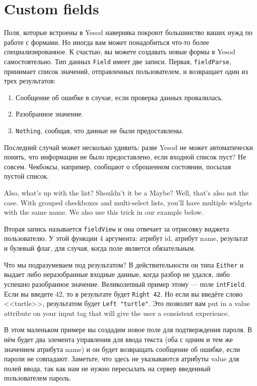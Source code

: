 \section{Custom fields}
Поля, которые встроены в Yesod наверняка покроют большинство ваших нужд по 
работе с формами. Но иногда вам может понадобиться что-то более специализированное.
К счастью, вы можете создавать новые формы в Yesod самостоятельно. Тип данных
\lstinline'Field' имеет две записи. Первая, \lstinline'fieldParse', принимает 
список значений, отправленных пользователем, и возвращает один из трех результатов:
\begin{enumerate}
 \item Сообщение об ошибке в случае, если проверка данных провалилась.
 \item Разобранное значение.
 \item \lstinline'Nothing', сообщая, что данные не были предоставлены.
\end{enumerate}	

Последний случай может несколько удивить: разве Yesod не может автоматически понять,
что информации не было предоставлено, если входной список пуст? Не совсем. Чекбоксы,
например, сообщают о сброшенном состоянии, посылая пустой список.

Also, what's up with the list?  
Shouldn't it be a Maybe? Well, that's also not the case.
With grouped checkboxes and multi-select lists, you'll have multiple widgets with the same
name. We also use this trick in our example below.

Вторая запись называется \lstinline'fieldView' и она отвечает за отрисовку виджета
пользователю. У этой функции 4 аргумента: атрибут id, атрибут name, результат и булевый флаг, 
для случая, когда поле является обязательным.

Что мы подразумеваем под результатом? В действительности он типа \lstinline'Either'
и выдает либо неразобранные входные данные, когда разбор не удался, либо успешно 
разобранное значение. Великолепный пример этому --- поле \lstinline'intField'.
Если вы введете 42, то в результате будет \lstinline'Right 42'. Но если вы введёте
слово <<turtle>>, результатом будет \lstinline'Left "turtle"'. Это позволит вам
put in a value attribute on your input tag
that will give the user a consistent experience.

В этом маленьком примере вы создадим новое поле для подтверждения пароля. В нём будет
два элемента управления для ввода текста (оба с одним и тем же значением атрибута name)
и он будет возвращать сообщение об ошибке, если пароли не совпадают. Заметьте, что
здесь не указываются атрибуты value для полей ввода, так как нам не нужно пересылать 
на сервер введенный пользователем пароль.


